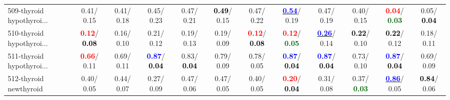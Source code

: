 \begin{table}[h]
\begin{center}
{\begin{tabular}{lc|c|c|c|c|c|c|c|c|c|c}
509-thyroid hypothyroi... &   0.41/  0.15 &   0.41/  0.18 &   0.45/  0.23 &   0.47/  0.21 & \textcolor{black}{\textbf{  0.49}}/  0.15 &   0.47/  0.22 & \underline{\textcolor{blue}{\textbf{  0.54}}}/  0.19 &   0.47/  0.19 &   0.40/  0.15 & \textcolor{red}{\textbf{  0.04}}/\textcolor{darkgreen}{\textbf{  0.03}} &   0.05/\textcolor{black}{\textbf{  0.04}} \\
510-thyroid hypothyroi... & \textcolor{red}{\textbf{  0.12}}/\textcolor{black}{\textbf{  0.08}} &   0.16/  0.10 &   0.21/  0.12 &   0.19/  0.13 &   0.19/  0.09 & \textcolor{red}{\textbf{  0.12}}/\textcolor{black}{\textbf{  0.08}} & \textcolor{red}{\textbf{  0.12}}/\textcolor{darkgreen}{\textbf{  0.05}} & \underline{\textcolor{blue}{\textbf{  0.26}}}/  0.14 & \textcolor{black}{\textbf{  0.22}}/  0.10 & \textcolor{black}{\textbf{  0.22}}/  0.12 &   0.18/  0.11 \\
511-thyroid hypothyroi... & \textcolor{red}{\textbf{  0.66}}/  0.11 &   0.69/  0.11 & \textcolor{blue}{\textbf{  0.87}}/\textcolor{black}{\textbf{  0.04}} &   0.83/\textcolor{black}{\textbf{  0.04}} &   0.79/  0.09 &   0.78/  0.05 & \textcolor{blue}{\textbf{  0.87}}/\textcolor{black}{\textbf{  0.04}} & \textcolor{blue}{\textbf{  0.87}}/\textcolor{black}{\textbf{  0.04}} &   0.73/  0.10 & \textcolor{blue}{\textbf{  0.87}}/\textcolor{black}{\textbf{  0.04}} &   0.69/  0.09 \\
512-thyroid newthyroid &   0.40/  0.05 &   0.44/  0.07 &   0.27/  0.09 &   0.47/  0.06 &   0.47/  0.05 &   0.40/  0.05 & \textcolor{red}{\textbf{  0.20}}/\textcolor{black}{\textbf{  0.04}} &   0.31/  0.08 &   0.37/\textcolor{darkgreen}{\textbf{  0.03}} & \underline{\textcolor{blue}{\textbf{  0.86}}}/  0.05 & \textcolor{black}{\textbf{  0.84}}/  0.06 \\\end{tabular}}\label{stratsALCKappa15AllReduxa}
\end{center}
\end{table}
